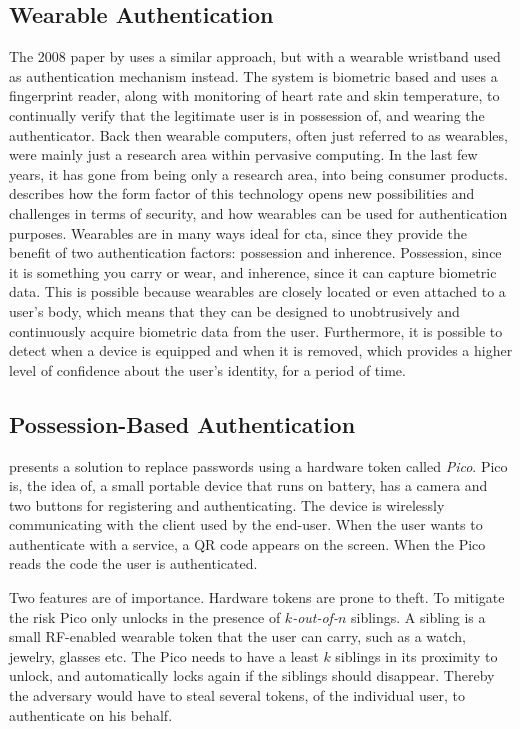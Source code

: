 
\subsection{Wearable Authentication}

The 2008 paper by \citet{ojala2008wearable} uses a similar approach, but with a wearable wristband used as authentication mechanism instead.
The system is biometric based and uses a fingerprint reader, along with monitoring of heart rate and skin temperature, to continually verify that the legitimate user is in possession of, and wearing the authenticator.
Back then wearable computers, often just referred to as wearables, were mainly just a research area within pervasive computing.
In the last few years, it has gone from being only a research area, into being consumer products.
\citet{bianchi2016wearable} describes how the form factor of this technology opens new possibilities and challenges in terms of security, and how wearables can be used for authentication purposes.
Wearables are in many ways ideal for \gls{cta}, since they provide the benefit of two authentication factors: possession and inherence.
Possession, since it is something you carry or wear, and inherence, since it can capture biometric data.
This is possible because wearables are closely located or even attached to a user's body, which means that they can be designed to unobtrusively and continuously acquire biometric data from the user.
Furthermore, it is possible to detect when a device is equipped and when it is removed, which provides a higher level of confidence about the user's identity, for a period of time. \cite{bianchi2016wearable} 

\subsection{Possession-Based Authentication}

\citet{stajano2011pico} presents a solution to replace passwords using a hardware token called \textit{Pico}.
Pico is, the idea of, a small portable device that runs on battery, has a camera and two buttons for registering and authenticating.
The device is wirelessly communicating with the client used by the end-user.
When the user wants to authenticate with a service, a QR code appears on the screen.
When the Pico reads the code the user is authenticated.


Two features are of importance.
Hardware tokens are prone to theft.
To mitigate the risk Pico only unlocks in the presence of \textit{$k$-out-of-$n$} siblings.
A sibling is a small RF-enabled wearable token that the user can carry, such as a watch, jewelry, glasses etc.
The Pico needs to have a least $k$ siblings in its proximity to unlock, and automatically locks again if the siblings should disappear.
Thereby the adversary would have to steal several tokens, of the individual user, to authenticate on his behalf.

